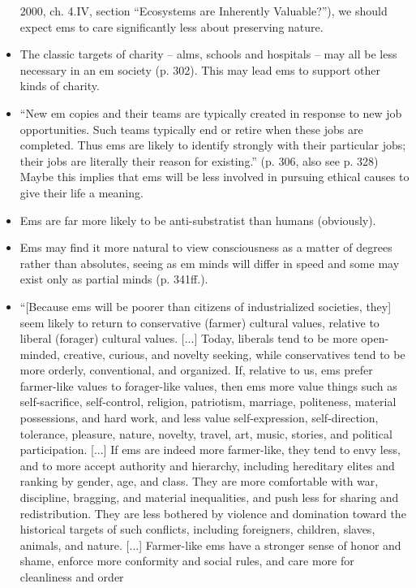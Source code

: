 \documentclass[]{article}
\begin{document}
\begin{itemize}
{{  2000, ch. 4.IV, section ``Ecosystems are Inherently Valuable?'')}}, we
  should expect ems to care significantly less about preserving nature.
\item
  The classic targets of charity -- alms, schools and hospitals -- may
  all be less necessary in an em society (p. 302). This may lead ems to
  support other kinds of charity.
\item
  ``New em copies and their teams are typically created in response to
  new job opportunities. Such teams typically end or retire when these
  jobs are completed. Thus ems are likely to identify strongly with
  their particular jobs; their jobs are literally their reason for
  existing.'' (p. 306, also see p. 328) Maybe this implies that ems will
  be less involved in pursuing ethical causes to give their life a
  meaning.
\item
  Ems are far more likely to be anti-substratist than humans
  (obviously).
\item
  Ems may find it more natural to view consciousness as a matter of
  degrees rather than absolutes, seeing as em minds will differ in speed
  and some may exist only as partial minds (p. 341ff.).
\item
  ``{[}Because ems will be poorer than citizens of industrialized
  societies, they{]} seem likely to return to conservative (farmer)
  cultural values, relative to liberal (forager) cultural values.
  {[}...{]} Today, liberals tend to be more open-minded, creative,
  curious, and novelty seeking, while conservatives tend to be more
  orderly, conventional, and organized. If, relative to us, ems prefer
  farmer-like values to forager-like values, then ems more value things
  such as self-sacrifice, self-control, religion, patriotism, marriage,
  politeness, material possessions, and hard work, and less value
  self-expression, self-direction, tolerance, pleasure, nature, novelty,
  travel, art, music, stories, and political participation. {[}...{]} If
  ems are indeed more farmer-like, they tend to envy less, and to more
  accept authority and hierarchy, including hereditary elites and
  ranking by gender, age, and class. They are more comfortable with war,
  discipline, bragging, and material inequalities, and push less for
  sharing and redistribution. They are less bothered by violence and
  domination toward the historical targets of such conflicts, including
  foreigners, children, slaves, animals, and nature. {[}...{]}
  Farmer-like ems have a stronger sense of honor and shame, enforce more
  conformity and social rules, and care more for cleanliness and order

\end{itemize}
\end{document}
